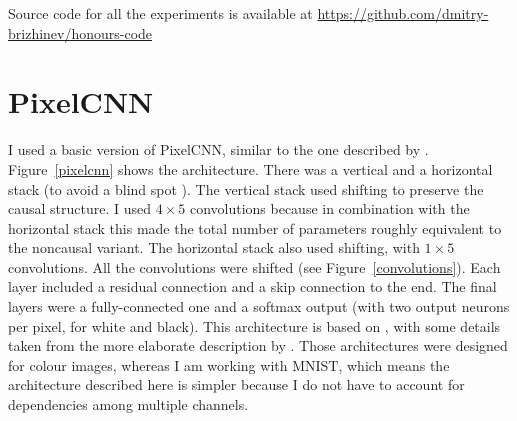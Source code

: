 \documentclass[11pt, a4paper, openany]{book}
\begin{document}
Source code for all the experiments is available at \url{https://github.com/dmitry-brizhinev/honours-code}

\section{PixelCNN}

I used a basic version of PixelCNN, similar to the one described by \citet{pixelcnn2}. Figure~\ref{pixelcnn} shows the architecture. There was a vertical and a horizontal stack (to avoid a blind spot \citep{pixelcnn2}). The vertical stack used shifting to preserve the causal structure. I used $4\times 5$ convolutions because in combination with the horizontal stack this made the total number of parameters roughly equivalent to the noncausal variant. The horizontal stack also used shifting, with $1\times 5$ convolutions. All the convolutions were shifted (see Figure~\ref{convolutions}). Each layer included a residual connection and a skip connection to the end. The final layers were a fully-connected one and a softmax output (with two output neurons per pixel, for white and black). This architecture is based on \citet{pixelcnn2}, with some details taken from the more elaborate description by \citet{pixelcnn3}. Those architectures were designed for colour images, whereas I am working with MNIST, which means the architecture described here is simpler because I do not have to account for dependencies among multiple channels.
\end{document}
